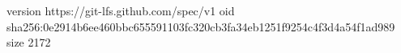 version https://git-lfs.github.com/spec/v1
oid sha256:0e2914b6ee460bbc655591103fc320cb3fa34eb1251f9254c4f3d4a54f1ad989
size 2172
